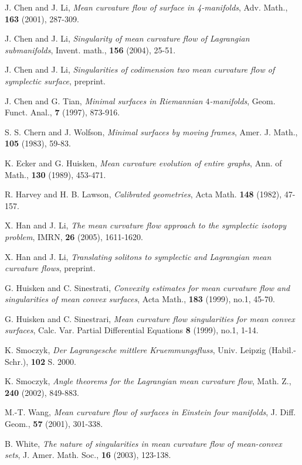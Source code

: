 {\small\begin{thebibliography}{999}

 J. Chen and J. Li, {\em Mean curvature flow of
surface in 4-manifolds}, Adv. Math., {\bf 163} (2001), 287-309.

 J. Chen and J. Li, {\em Singularity of
 mean curvature flow of Lagrangian submanifolds}, Invent. math.,
 {\bf 156} (2004), 25-51.

  J. Chen and J. Li, {\em Singularities of codimension two mean curvature flow of symplectic
 surface}, preprint.

 J. Chen and G. Tian, {\em Minimal surfaces in
Riemannian $4$-manifolds}, Geom. Funct. Anal., {\bf 7} (1997),
873-916.

 S. S. Chern and J. Wolfson, {\em Minimal surfaces by moving
frames}, Amer. J. Math., {\bf 105} (1983), 59-83.

 K. Ecker and G. Huisken, {\em Mean curvature evolution of
entire graphs}, Ann. of Math., {\bf 130} (1989), 453-471.

 R. Harvey and H. B. Lawson, {\em Calibrated
geometries}, Acta Math. {\bf 148} (1982), 47-157.

 X. Han and J. Li, {\em The mean curvature flow
approach to the symplectic isotopy problem}, IMRN, {\bf 26}
(2005), 1611-1620.

 X. Han and J. Li, {\em Translating solitons to
symplectic and Lagrangian mean curvature flows}, preprint.

 G. Huisken and C. Sinestrati, {\em Convexity
estimates for mean curvature flow and singularities of mean convex
surfaces}, Acta Math., {\bf 183} (1999), no.1, 45-70.

 G. Huisken and C. Sinestrari, {\em Mean curvature
flow singularities for mean convex surfaces}, Calc. Var. Partial
Differential Equations {\bf 8} (1999), no.1, 1-14.

 K. Smoczyk, {\em Der Lagrangesche mittlere
Kruemmungsfluss}, Univ. Leipzig (Habil.-Schr.), {\bf 102} S. 2000.

 K. Smoczyk, {\em Angle theorems for the Lagrangian
mean curvature flow}, Math. Z., {\bf 240} (2002), 849-883.

 M.-T. Wang, {\em Mean curvature flow of surfaces in
Einstein four manifolds}, J. Diff. Geom., {\bf 57} (2001),
301-338.

 B. White, {\em The nature of singularities in mean
curvature flow of mean-convex sets}, J. Amer. Math. Soc., {\bf 16}
(2003), 123-138.

\end{thebibliography}}



